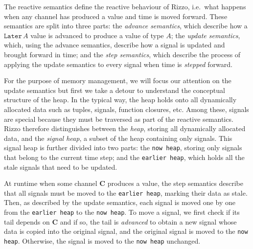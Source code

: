 The reactive semantics define the reactive behaviour of Rizzo, i.e.\ what happens when any channel has produced a value and time is moved forward. 
These semantics are split into three parts:
the \textit{advance semantics}, which describe how a $\texttt{Later}\, A$ value is advanced to produce a value of type $A$; 
the \textit{update semantics}, which, using the advance semantics, describe how a signal is updated and brought forward in time;
and the \textit{step semantics}, which describe the process of applying the update semantics to every signal when time is \textit{stepped} forward.

For the purpose of memory management, we will focus our attention on the update semantics but first we take a detour to understand the conceptual structure of the heap.
In the typical way, the heap holds onto all dynamically allocated data such as tuples, signals, function closures, etc.
Among these, signals are special because they must be traversed as part of the reactive semantics. Rizzo therefore distinguishes between the \textit{heap}, storing all dynamically allocated data, and the \textit{signal heap}, a subset of the heap containing only signals. This signal heap is further divided into two parts: the \texttt{now heap}, storing only signals that belong to the current time step; and the \texttt{earlier heap}, which holds all the stale signals that need to be updated.

At runtime when some channel $\mathbf{C}$ produces a value, the step semantics describe that all signals must be moved to the \texttt{earlier heap}, marking their data as stale.
Then, as described by the update semantics, each signal is moved one by one from the \texttt{earlier heap} to the \texttt{now heap}. To move a signal, we first check if its tail depends on $\mathbf{C}$ and if so, the tail is \textit{advanced} to obtain a new signal whose data is copied into the original signal, and the original signal is moved to the \texttt{now heap}. Otherwise, the signal is moved to the \texttt{now heap} unchanged.

